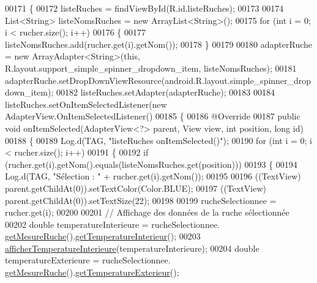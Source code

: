 \begin{DoxyCode}
00171     \{
00172         listeRuches = findViewById(R.id.listeRuches);
00173 
00174         List<String> listeNomsRuches = \textcolor{keyword}{new} ArrayList<String>();
00175         \textcolor{keywordflow}{for} (\textcolor{keywordtype}{int} i = 0; i < rucher.size(); i++)
00176         \{
00177             listeNomsRuches.add(rucher.get(i).getNom());
00178         \}
00179 
00180         adapterRuche = \textcolor{keyword}{new} ArrayAdapter<String>(\textcolor{keyword}{this}, R.layout.support\_simple\_spinner\_dropdown\_item, 
      listeNomsRuches);
00181         adapterRuche.setDropDownViewResource(android.R.layout.simple\_spinner\_dropdown\_item);
00182         listeRuches.setAdapter(adapterRuche);
00183 
00184         listeRuches.setOnItemSelectedListener(\textcolor{keyword}{new} AdapterView.OnItemSelectedListener()
00185         \{
00186             @Override
00187             \textcolor{keyword}{public} \textcolor{keywordtype}{void} onItemSelected(AdapterView<?> parent, View view, \textcolor{keywordtype}{int} position, \textcolor{keywordtype}{long} \textcolor{keywordtype}{id})
00188             \{
00189                 Log.d(TAG, \textcolor{stringliteral}{"listeRuches onItemSelected()"});
00190                 \textcolor{keywordflow}{for} (\textcolor{keywordtype}{int} i = 0; i < rucher.size(); i++)
00191                 \{
00192                     \textcolor{keywordflow}{if} (rucher.get(i).getNom().equals(listeNomsRuches.get(position)))
00193                     \{
00194                         Log.d(TAG, \textcolor{stringliteral}{"Sélection : "} + rucher.get(i).getNom());
00195 
00196                         ((TextView) parent.getChildAt(0)).setTextColor(Color.BLUE);
00197                         ((TextView) parent.getChildAt(0)).setTextSize(22);
00198 
00199                         rucheSelectionnee = rucher.get(i);
00200 
00201                         \textcolor{comment}{// Affichage des données de la ruche sélectionnée}
00202                         \textcolor{keywordtype}{double} temperatureInterieure = rucheSelectionnee.
      \hyperlink{classcom_1_1example_1_1bee__honeyt_1_1_ruche_afab94785f8af31f6ce436394ab41c9f3}{getMesureRuche}().\hyperlink{classcom_1_1example_1_1bee__honeyt_1_1_mesure_ruche_ab552e0788fc7dba1e9ef83a0fce861f8}{getTemperatureInterieur}();
00203                         \hyperlink{classcom_1_1example_1_1bee__honeyt_1_1_i_h_m_mobile_ac0f55897a183a0887c87954f6fbfdf2f}{afficherTemperatureInterieure}(temperatureInterieure);
00204                         \textcolor{keywordtype}{double} temperatureExterieure = rucheSelectionnee.
      \hyperlink{classcom_1_1example_1_1bee__honeyt_1_1_ruche_afab94785f8af31f6ce436394ab41c9f3}{getMesureRuche}().\hyperlink{classcom_1_1example_1_1bee__honeyt_1_1_mesure_ruche_a8628b499066f185d78ae015ce50557a8}{getTemperatureExterieur}();

\end{DoxyCode}
